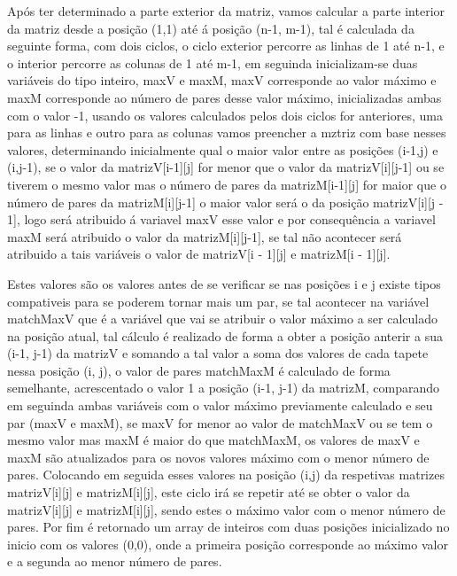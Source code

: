 \documentclass[11pt]{article}
\begin{document}
Após ter determinado a parte exterior da matriz, vamos calcular a parte interior da matriz desde a posição (1,1) até á posição (n-1, m-1), tal é calculada da seguinte forma, com dois ciclos, o ciclo exterior percorre as linhas de 1 até n-1, e o interior percorre as colunas de 1 até m-1,  em seguinda inicializam-se duas variáveis do tipo inteiro, maxV e maxM, maxV corresponde ao valor máximo e maxM corresponde ao número de pares desse valor máximo, inicializadas ambas com o valor -1, usando os valores calculados pelos dois ciclos for anteriores, uma para as linhas e outro para as colunas vamos preencher a mztriz com base nesses valores, determinando inicialmente qual o maior valor entre as posições (i-1,j) e (i,j-1), se o valor da matrizV[i-1][j] for menor que o valor da matrizV[i][j-1] ou se tiverem o mesmo valor mas o número de pares da matrizM[i-1][j] for maior que o número de pares da matrizM[i][j-1] o maior valor será o da posição matrizV[i][j - 1], logo será atribuido á variavel maxV esse valor e por consequência a variavel maxM será atribuido o valor da matrizM[i][j-1], se tal não acontecer será atribuido a tais variáveis o valor de matrizV[i - 1][j] e matrizM[i - 1][j]. 


Estes valores são os valores antes de se verificar se nas posições i e j existe tipos compativeis para se poderem tornar mais um par, se tal acontecer na variável matchMaxV que é a variável que vai se atribuir o valor máximo a ser calculado na posição atual, tal cálculo é realizado de forma a obter a posição anterir a sua (i-1, j-1) da matrizV e somando a tal valor a soma dos valores de cada tapete nessa posição (i, j), o valor de pares matchMaxM é calculado de forma semelhante, acrescentado o valor 1 a posição (i-1, j-1) da matrizM, comparando em seguinda ambas variáveis com o valor máximo previamente calculado e seu par (maxV e maxM), se maxV for menor ao valor de matchMaxV ou se tem o mesmo valor mas maxM é maior do que matchMaxM, os valores de maxV e maxM são atualizados para os novos valores máximo com o menor número de pares. Colocando em seguida esses valores na posição (i,j) da respetivas matrizes  matrizV[i][j] e matrizM[i][j], este ciclo irá se repetir até se obter o valor da matrizV[i][j] e matrizM[i][j], sendo estes o máximo valor com o menor número de pares. Por fim é retornado um array de inteiros com duas posições inicializado no inicio com os valores (0,0), onde a primeira posição corresponde ao máximo valor e a segunda ao menor número de pares.
\end{document}
